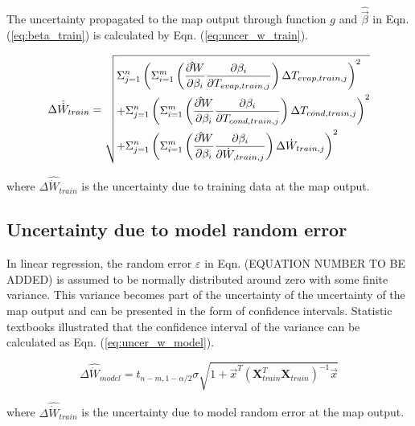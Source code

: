 The uncertainty propagated to the map output through function $g$ and $\hat{ \vec {\beta}}$ in Eqn. (\ref{eq:beta_train}) is calculated by Eqn. (\ref{eq:uncer_w_train}).

\begin{equation}
\Delta {\hat{\dot{W}}_{train}} = \sqrt{\begin{gathered}
  \Sigma_{j=1}^n\left(\Sigma _{i = 1}^m\left(\frac{{\partial \hat \dot W}}{{\partial {\beta _i}}}\frac{{\partial {\beta _i}}}{{\partial {T_{evap,train,j}}}}\right)\Delta {T_{evap,train,j}}\right)^2  \hfill \\
  +\Sigma_{j=1}^n\left(\Sigma _{i = 1}^m\left(\frac{{\partial \hat \dot W}}{{\partial {\beta _i}}}\frac{{\partial {\beta _i}}}{{\partial {T_{cond,train,j}}}}\right)\Delta {T_{cond,train,j}}\right)^2 \hfill \\
   +\Sigma_{j=1}^n\left(\Sigma _{i = 1}^m\left(\frac{{\partial \hat \dot W}}{{\partial {\beta _i}}}\frac{{\partial {\beta _i}}}{{\partial {\dot{W}_{,train,j}}}}\right)\Delta {\dot{W}_{train,j}}\right)^2 \hfill \\ 
\end{gathered}}
\label{eq:uncer_w_train}
\end{equation}

where $\Delta {\hat{\dot{W}}_{train}}$ is the uncertainty due to training data at the map output.

\subsection{Uncertainty due to model random error} \label{subsec:uncer_model}

In linear regression, the random error $\varepsilon$ in Eqn. (EQUATION NUMBER TO BE ADDED) is assumed to be normally distributed around zero with some finite variance. This variance becomes part of the uncertainty of the uncertainty of the map output and can be presented in the form of confidence intervals. Statistic textbooks \cite{Montgomery:2005,Graybill:1994} illustrated that the confidence interval of the variance can be calculated as Eqn. (\ref{eq:uncer_w_model}).

\begin{equation}
\Delta {\hat{\dot{W}}_{model}} = {t_{n - m,1 - \alpha /2}}\sigma \sqrt {1 + {{\vec x}^T}{{({\mathbf{X}}_{train}^T{{\mathbf{X}}_{train}})}^{ - 1}}\vec x}
\label{eq:uncer_w_model}
\end{equation}

where $\Delta {\hat{\dot{W}}_{train}}$ is the uncertainty due to model random error at the map output.

